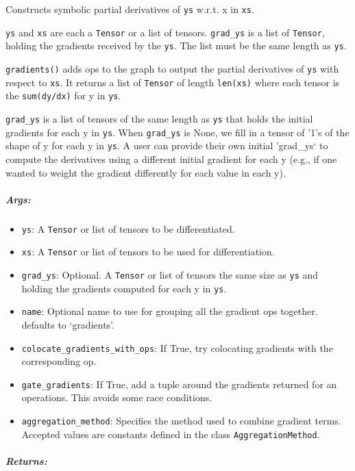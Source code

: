 Constructs symbolic partial derivatives of \texttt{ys} w.r.t. x in
\texttt{xs}.

\texttt{ys} and \texttt{xs} are each a \texttt{Tensor} or a list of
tensors. \texttt{grad\_ys} is a list of \texttt{Tensor}, holding the
gradients received by the \texttt{ys}. The list must be the same length
as \texttt{ys}.

\texttt{gradients()} adds ops to the graph to output the partial
derivatives of \texttt{ys} with respect to \texttt{xs}. It returns a
list of \texttt{Tensor} of length \texttt{len(xs)} where each tensor is
the \texttt{sum(dy/dx)} for y in \texttt{ys}.

\texttt{grad\_ys} is a list of tensors of the same length as \texttt{ys}
that holds the initial gradients for each y in \texttt{ys}. When
\texttt{grad\_ys} is None, we fill in a tensor of '1's of the shape of y
for each y in \texttt{ys}. A user can provide their own initial
'grad\_ys` to compute the derivatives using a different initial gradient
for each y (e.g., if one wanted to weight the gradient differently for
each value in each y).

\subparagraph{Args: }\label{args-11}

\begin{itemize}
\tightlist
\item
  \texttt{ys}: A \texttt{Tensor} or list of tensors to be
  differentiated.
\item
  \texttt{xs}: A \texttt{Tensor} or list of tensors to be used for
  differentiation.
\item
  \texttt{grad\_ys}: Optional. A \texttt{Tensor} or list of tensors the
  same size as \texttt{ys} and holding the gradients computed for each y
  in \texttt{ys}.
\item
  \texttt{name}: Optional name to use for grouping all the gradient ops
  together. defaults to `gradients'.
\item
  \texttt{colocate\_gradients\_with\_ops}: If True, try colocating
  gradients with the corresponding op.
\item
  \texttt{gate\_gradients}: If True, add a tuple around the gradients
  returned for an operations. This avoids some race conditions.
\item
  \texttt{aggregation\_method}: Specifies the method used to combine
  gradient terms. Accepted values are constants defined in the class
  \texttt{AggregationMethod}.
\end{itemize}

\subparagraph{Returns: }\label{returns-5}


